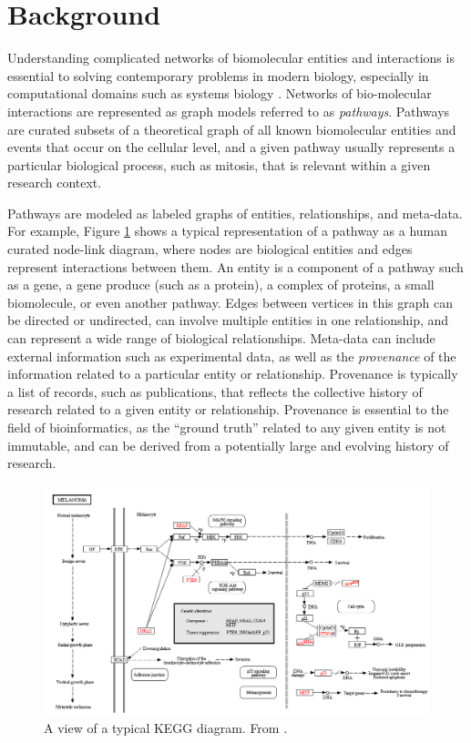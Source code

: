 \section*{Background}

Understanding complicated networks of biomolecular entities and interactions is essential to solving contemporary problems in modern biology, especially in computational domains such as systems biology \cite{hanahan2011hallmarks}.
Networks of bio-molecular interactions are represented as graph models referred to as \emph{pathways}.
Pathways are curated subsets of a theoretical graph of all known biomolecular entities and events that occur on the cellular level, and a given pathway usually represents a particular biological process, such as mitosis, that is relevant within a given research context.

Pathways are modeled as labeled graphs of entities, relationships, and meta-data. For example, Figure \ref{fig:kvik} shows a typical representation of a pathway as a human curated node-link diagram, where nodes are biological entities and edges represent interactions between them.
An entity is a component of a pathway such as a gene, a gene produce (such as a protein), a complex of proteins, a small biomolecule, or even another pathway.
Edges between vertices in this graph can be directed or undirected, can involve multiple entities in one relationship, and can represent a wide range of biological relationships.
Meta-data can include external information such as experimental data, as well as the \emph{provenance} of the information related to a particular entity or relationship.
Provenance is typically a list of records, such as publications, that reflects the collective history of research related to a given entity or relationship.
Provenance is essential to the field of bioinformatics, as the ``ground truth'' related to any given entity is not immutable, and can be derived from a potentially large and evolving history of research.

\begin{figure}[htb]
  \centering
  \includegraphics[width=\linewidth]{figures/kegg2}
  \caption{\label{fig:kvik} A view of a typical KEGG diagram. From \cite{Fjukstad2014kvik}.}
\end{figure}

